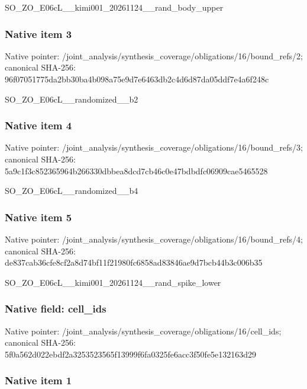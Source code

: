 \documentclass[10pt,a4paper]{article}
\begin{document}
SO\_ZO\_E06cL\_\_kimi001\_202\allowbreak{}61124\_\_rand\_body\_upper


\subsubsection{Native item 3}


Native pointer: /joint\_analysis/synthesi\allowbreak{}s\_coverage/obligations/1\allowbreak{}6/bound\_refs/2; canonical SHA-256: 96f07051775da2bb30ba4b09\allowbreak{}8a75e9d7e6463db2c4d6d87d\allowbreak{}a05ddf7e4a6f248c


SO\_ZO\_E06cL\_\_randomized\_\_b2


\subsubsection{Native item 4}


Native pointer: /joint\_analysis/synthesi\allowbreak{}s\_coverage/obligations/1\allowbreak{}6/bound\_refs/3; canonical SHA-256: 5a9c1f3c852365964b266330\allowbreak{}dbbea8dcd7cb46c0e47bdbdf\allowbreak{}c06909cae5465528


SO\_ZO\_E06cL\_\_randomized\_\_b4


\subsubsection{Native item 5}


Native pointer: /joint\_analysis/synthesi\allowbreak{}s\_coverage/obligations/1\allowbreak{}6/bound\_refs/4; canonical SHA-256: de837cab36cfe8cf2a8d74bf\allowbreak{}11f21980fc6858ad83846ae9\allowbreak{}d7bcb44b3c006b35


SO\_ZO\_E06cL\_\_kimi001\_202\allowbreak{}61124\_\_rand\_spike\_lower


\subsubsection{Native field: cell\_ids}


Native pointer: /joint\_analysis/synthesi\allowbreak{}s\_coverage/obligations/1\allowbreak{}6/cell\_ids; canonical SHA-256: 5f0a562d022ebdf2a3253523\allowbreak{}565f13999f6fa0325fe6acc3\allowbreak{}f50fe5e132163d29



\subsubsection{Native item 1}
\end{document}
